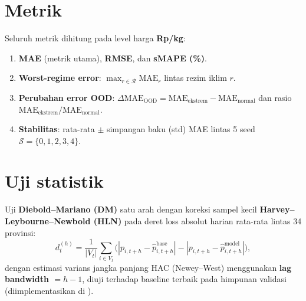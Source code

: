 \documentclass[11pt,a4paper]{article}
\begin{document}
\section{Metrik}
Seluruh metrik dihitung pada level harga \textbf{Rp/kg}:
\begin{enumerate}
  \item \textbf{MAE} (metrik utama), \textbf{RMSE}, dan \textbf{sMAPE (\%)}.
  \item \textbf{Worst-regime error}: $\max_{r \in \mathcal{R}} \text{MAE}_r$ lintas rezim iklim $r$.
  \item \textbf{Perubahan error OOD}: $\Delta\text{MAE}_{\text{OOD}} = \text{MAE}_{\text{ekstrem}} - \text{MAE}_{\text{normal}}$ dan rasio $\text{MAE}_{\text{ekstrem}} / \text{MAE}_{\text{normal}}$.
  \item \textbf{Stabilitas}: rata-rata $\pm$ simpangan baku (std) MAE lintas 5 seed $\mathcal{S} = \{0, 1, 2, 3, 4\}$.
\end{enumerate}

\section{Uji statistik}
Uji \textbf{Diebold--Mariano (DM)} satu arah dengan koreksi sampel kecil \textbf{Harvey--Leybourne--Newbold (HLN)} pada deret loss absolut harian rata-rata lintas 34 provinsi:
\[
  d_t^{(h)} = \frac{1}{|V_t|} \sum_{i \in V_t} \Big( |p_{i,t+h} - \hat{p}^{\text{base}}_{i,t+h}| - |p_{i,t+h} - \hat{p}^{\text{model}}_{i,t+h}| \Big),
\]
dengan estimasi varians jangka panjang HAC (Newey--West) menggunakan \textbf{lag bandwidth $= h - 1$}, diuji terhadap baseline terbaik pada himpunan validasi (diimplementasikan di ).
\end{document}
